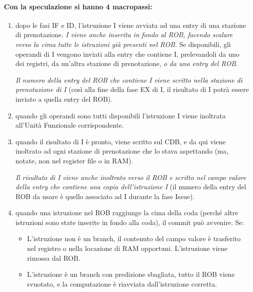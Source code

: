 \paragraph{Con la speculazione si hanno 4 macropassi:}

\begin{enumerate}
  \item {} dopo le fasi IF e ID, l’istruzione I viene avviata ad una entry di
una stazione di prenotazione. \textit{I viene anche inserita in fondo
al ROB, facendo scalare verso la cima tutte le istruzioni già
presenti nel ROB.} Se disponibili, gli operandi di I vengono inviati alla entry che
contiene I, prelevandoli da uno dei registri, da un’altra stazione
di prenotazione, \textit{o da una entry del ROB}. 

\textit{Il numero della entry del ROB che contiene I viene scritto
nella stazione di prenotazione di I} (così alla fine della fase EX
di I, il risultato di I potrà essere inviato a quella entry del ROB).

  \item {} quando gli operandi sono tutti disponibili l’istruzione I viene
inoltrata all’Unità Funzionale corrispondente. 

\item {} quando il risultato di I è pronto, viene scritto sul CDB, e da qui
viene inoltrato ad ogni stazione di prenotazione che lo stava
aspettando (ma, notate, non nel register file o in RAM).
  
\textit{Il risultato di I viene anche inoltrato verso il ROB e scritto
nel campo valore della entry che contiene una copia
dell’istruzione I} (il numero della entry del ROB da usare è
quello associato ad I durante la fase Issue).

\item {} quando una istruzione nel ROB raggiunge la cima della coda
(perché altre istruzioni sono state inserite in fondo alla coda), il
commit può avvenire. Se: 
\begin{itemize}
  \item L’istruzione non è un branch, il contenuto del campo valore
è trasferito nel registro o nella locazione di RAM opportuni.
L’istruzione viene rimossa dal ROB. 
\item L’istruzione è un branch con predizione sbagliata, tutto
il ROB viene svuotato, e la computazione è riavviata
dall’istruzione corretta.
\end{itemize}
\end{enumerate}

